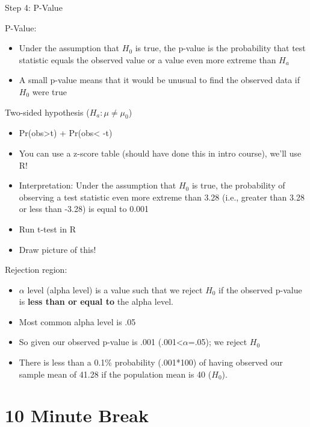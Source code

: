 \documentclass[
  8pt,
  ignorenonframetext,
  dvipsnames]{beamer}
\providecommand{\tightlist}{%
  \setlength{\itemsep}{0pt}\setlength{\parskip}{0pt}}
\renewcommand{\textbf}[1]{{\color{darkgray}\bfseries\fontfamily{Montserrat-TOsF}#1}}
\let\olditem\item
\renewcommand{\item}{%
  \olditem\vspace{4pt}
}
\begin{document}
\begin{frame}{Step 4: P-Value}
\protect\hypertarget{step-4-p-value}{}

P-Value:

\begin{itemize}
\tightlist
\item
  Under the assumption that \(H_0\) is true, the p-value is the
  probability that test statistic equals the observed value or a value
  even more extreme than \(H_a\)
\item
  A small p-value means that it would be unusual to find the observed
  data if \(H_0\) were true
\end{itemize}

\medskip

Two-sided hypothesis (\(H_a: \mu \ne \mu_0\))

\begin{itemize}
\tightlist
\item
  Pr(obs\textgreater t) + Pr(obs\textless{} -t)
\item
  You can use a z-score table (should have done this in intro course),
  we'll use R!
\item
  Interpretation: Under the assumption that \(H_0\) is true, the
  probability of observing a test statistic even more extreme than 3.28
  (i.e., greater than 3.28 or less than -3.28) is equal to 0.001
\item
  Run t-test in R
\item
  Draw picture of this!
\end{itemize}

\medskip

Rejection region:

\begin{itemize}
\tightlist
\item
  \(\alpha\) level (alpha level) is a value such that we reject \(H_0\)
  if the observed p-value is \textbf{less than or equal to} the alpha
  level.
\item
  Most common alpha level is .05
\item
  So given our observed p-value is .001 (.001\textless{}\(\alpha\)=.05);
  we reject \(H_0\)
\item
  There is less than a 0.1\% probability (.001*100) of having observed
  our sample mean of 41.28 if the population mean is 40 (\(H_0\)).
\end{itemize}

\end{frame}

\hypertarget{minute-break}{%
\section{10 Minute Break}\label{minute-break}}
\end{document}
